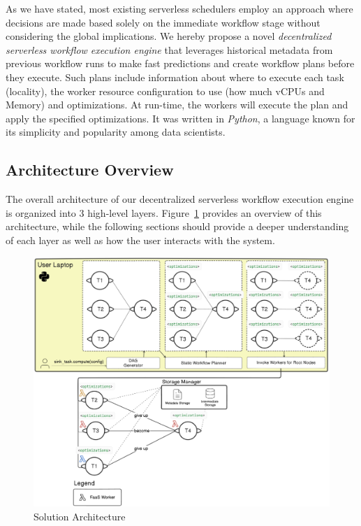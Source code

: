 \documentclass[conference]{IEEEtran}
\begin{document}
As we have stated, most existing serverless schedulers employ an approach where decisions are made based solely on the immediate workflow stage without considering the global implications. We hereby propose a novel \textit{decentralized serverless workflow execution engine} that leverages historical metadata from previous workflow runs to make fast predictions and create workflow plans before they execute. Such plans include information about where to execute each task (locality), the worker resource configuration to use (how much vCPUs and Memory) and optimizations. At run-time, the workers will execute the plan and apply the specified optimizations. It was written in \textit{Python}, a language known for its simplicity and popularity among data scientists.

\subsection{Architecture Overview}

The overall architecture of our decentralized serverless workflow execution engine is organized into 3 high-level layers. Figure~\ref{fig:solution_architecture} provides an overview of this architecture, while the following sections should provide a deeper understanding of each layer as well as how the user interacts with the system.

\begin{figure}[h]
  \centering
  \includegraphics[width=\columnwidth]{figures/solution_distributedarchintegrated.png}
  \caption{Solution Architecture}
  \label{fig:solution_architecture}
\end{figure}
\end{document}
